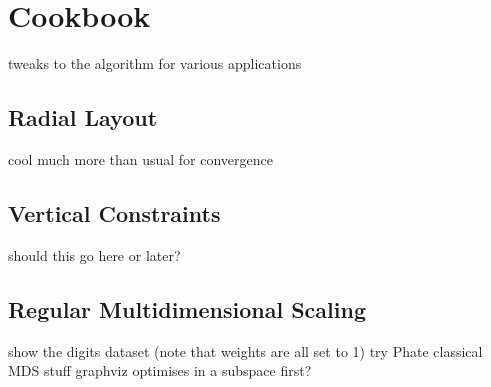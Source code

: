 \section{Cookbook}
tweaks to the algorithm for various applications
\subsection{Radial Layout}
cool much more than usual for convergence
\subsection{Vertical Constraints}
should this go here or later?
\subsection{Regular Multidimensional Scaling}
show the digits dataset (note that weights are all set to 1)
try Phate classical MDS stuff
graphviz optimises in a subspace first?